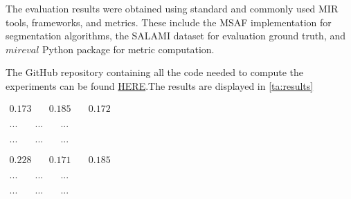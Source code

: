
The evaluation results were obtained using standard and commonly used MIR tools, frameworks, and metrics. These include the MSAF \cite{MSAF} implementation for segmentation algorithms, the SALAMI dataset \cite{Smith2011DESIGNANNOTATIONS} for evaluation ground truth, and $mireval$ Python package \cite{RaffelMir_eval:METRICS} for metric computation.

The GitHub repository containing all the code needed to compute the experiments can be found \href{https://github.com/oriolcolomefont/Master-Thesis.git}{HERE}.The results are displayed in \ref{ta:results}


\newsavebox\mfccSF
\begin{lrbox}{\mfccSF}
\centering
   $\begin{aligned}
     0.173 & \quad 0.185 & \quad 0.172 %
    \end{aligned} $
\end{lrbox}

\newsavebox\mfccFoote
\begin{lrbox}{\mfccFoote}
\centering
   $\begin{aligned}
     ... & \quad ... & \quad ... %
    \end{aligned} $
\end{lrbox}

\newsavebox\mfccCNMF
\begin{lrbox}{\mfccCNMF}
\centering
   $\begin{aligned}
     ... & \quad ... & \quad ... %
    \end{aligned} $
\end{lrbox}

\newsavebox\embeddioaSF
\begin{lrbox}{\embeddioaSF}
   $\begin{aligned}
     0.228 & \quad 0.171 & \quad 0.185
    \end{aligned} $
\end{lrbox}

\newsavebox\embeddioaFoote
\begin{lrbox}{\embeddioaFoote}
   $\begin{aligned}
     ... & \quad ... & \quad ...
    \end{aligned} $
\end{lrbox}

\newsavebox\embeddioaCNMF
\begin{lrbox}{\embeddioaCNMF}
   $\begin{aligned}
     ... & \quad ... & \quad ...
    \end{aligned} $
\end{lrbox}

